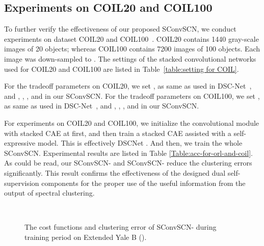\documentclass[10pt,twocolumn,letterpaper]{article}
\begin{document}
\subsection{Experiments on COIL20 and COIL100}

To further verify the effectiveness of our proposed SConvSCN, we conduct experiments on dataset COIL20 and COIL100~\cite{Nene:COIL}. COIL20 contains 1440 gray-scale images of 20 objects; whereas COIL100 contains 7200 images of 100 objects. Each image was down-sampled to . The settings of the stacked convolutional networks used for COIL20 and COIL100 are listed in Table~\ref{table:setting for COIL}.

For the tradeoff parameters on COIL20, we set ,  as same as used in DSC-Net~\cite{Ji:NIPS17}, and , , , and  in our SConvSCN.
For the tradeoff parameters on COIL100, we set ,  as same as used in DSC-Net~\cite{Ji:NIPS17},
and , , , and  in our SConvSCN.



For experiments on COIL20 and COIL100, we initialize the convolutional module with stacked CAE at first, and then train a stacked CAE assisted with a self-expressive model. This is effectively DSCNet \cite{Ji:NIPS17}. And then, we train the whole SConvSCN. Experimental results are listed in Table \ref{Table:acc-for-orl-and-coil}. As could be read, our SConvSCN- and SConvSCN- reduce the clustering errors significantly. This result confirms the effectiveness of the designed dual self-supervision components for the proper use of the useful information from the output of spectral clustering.


\begin{figure}
\vspace{-10pt}
\small
\centering
{}
\\
 
\caption{The cost functions and clustering error of SConvSCN- during training period on Extended Yale B (). }
\label{fig:Acc-Costs-vs-epoch-ExYaleB}
\end{figure}
\end{document}
